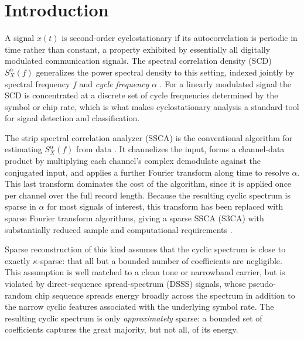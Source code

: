 \documentclass[10pt,twocolumn]{article}
\begin{document}
\section{Introduction}

A signal $x(t)$ is second-order cyclostationary if its autocorrelation is
periodic in time rather than constant, a property exhibited by essentially
all digitally modulated communication signals. The spectral correlation
density (SCD) $S_X^{\alpha}(f)$ generalizes the power spectral density to
this setting, indexed jointly by spectral frequency $f$ and \emph{cycle
frequency} $\alpha$ \cite{gardner1986}. For a linearly modulated signal the
SCD is concentrated at a discrete set of cycle frequencies determined by
the symbol or chip rate, which is what makes cyclostationary analysis a
standard tool for signal detection and classification.

The strip spectral correlation analyzer (SSCA) is the conventional
algorithm for estimating $S_X^{\alpha}(f)$ from data
\cite{roberts1991}. It channelizes the input, forms a channel-data product
by multiplying each channel's complex demodulate against the conjugated
input, and applies a further Fourier transform along time to resolve
$\alpha$. This last transform dominates the cost of the algorithm, since it
is applied once per channel over the full record length. Because the
resulting cyclic spectrum is sparse in $\alpha$ for most signals of
interest, this transform has been replaced with sparse Fourier
transform algorithms, giving a sparse SSCA (S3CA) with substantially
reduced sample and computational requirements \cite{s3ca2015,
hassanieh2012}.

Sparse reconstruction of this kind assumes that the cyclic spectrum is
close to exactly $\kappa$-sparse: that all but a bounded number of
coefficients are negligible. This assumption is well matched to a clean
tone or narrowband carrier, but is violated by direct-sequence
spread-spectrum (DSSS) signals, whose pseudo-random chip sequence spreads
energy broadly across the spectrum in addition to the narrow cyclic
features associated with the underlying symbol rate. The resulting cyclic
spectrum is only \emph{approximately} sparse: a bounded set of coefficients
captures the great majority, but not all, of its energy.
\end{document}
